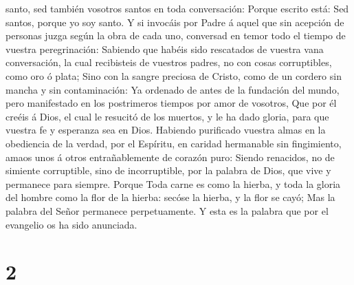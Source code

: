 santo, sed también vosotros santos en toda conversación: 
Porque escrito está: Sed santos, porque yo soy santo.  Y
si invocáis por Padre á aquel que sin acepción de personas juzga según
la obra de cada uno, conversad en temor todo el tiempo de vuestra
peregrinación:  Sabiendo que habéis sido rescatados de
vuestra vana conversación, la cual recibisteis de vuestros padres, no
con cosas corruptibles, como oro ó plata;  Sino con la
sangre preciosa de Cristo, como de un cordero sin mancha y sin
contaminación:  Ya ordenado de antes de la fundación del
mundo, pero manifestado en los postrimeros tiempos por amor de vosotros,
 Que por él creéis á Dios, el cual le resucitó de los
muertos, y le ha dado gloria, para que vuestra fe y esperanza sea en
Dios.  Habiendo purificado vuestra almas en la obediencia
de la verdad, por el Espíritu, en caridad hermanable sin fingimiento,
amaos unos á otros entrañablemente de corazón puro: 
Siendo renacidos, no de simiente corruptible, sino de incorruptible, por
la palabra de Dios, que vive y permanece para siempre. 
Porque Toda carne es como la hierba, y toda la gloria del hombre como la
flor de la hierba: secóse la hierba, y la flor se cayó; 
Mas la palabra del Señor permanece perpetuamente. Y esta es la palabra
que por el evangelio os ha sido anunciada.

\hypertarget{section-1}{%
\section{2}\label{section-1}}

